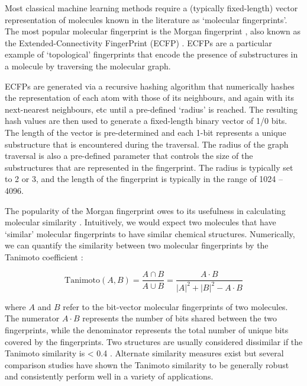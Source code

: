 
Most classical machine learning methods require a (typically fixed-length) vector representation of molecules known in the literature as `molecular fingerprints'. The most popular molecular fingerprint is the Morgan fingerprint \cite{morgan1965fingerprints}, also known as the Extended-Connectivity FingerPrint (ECFP) \cite{rogers2010extended}. ECFPs are a particular example of `topological' fingerprints that encode the presence of substructures in a molecule by traversing the molecular graph.

ECFPs are generated via a recursive hashing algorithm that numerically hashes the representation of each atom with those of its neighbours, and again with its next-nearest neighbours, etc until a pre-defined `radius' is reached. The resulting hash values are then used to generate a fixed-length binary vector of 1/0 bits. The length of the vector is pre-determined and each 1-bit represents a unique substructure that is encountered during the traversal. The radius of the graph traversal is also a pre-defined parameter that controls the size of the substructures that are represented in the fingerprint. The radius is typically set to 2 or 3, and the length of the fingerprint is typically in the range of 1024 -- 4096.

The popularity of the Morgan fingerprint owes to its usefulness in calculating molecular similarity \cite{Maggiora2014similarity}. Intuitively, we would expect two molecules that have `similar' molecular fingerprints to have similar chemical structures. Numerically, we can quantify the similarity between two molecular fingerprints by the Tanimoto coefficient \cite{Willet1998similarity}:

\begin{equation} \label{eqn:tanimoto}
 \mathrm{Tanimoto}(A, B) = \frac{A \cap B}{A \cup B} = \frac{A \cdot B}{|A|^{2} + |B|^{2} - A \cdot B}
\end{equation}

where $A$ and $B$ refer to the bit-vector molecular fingerprints of two molecules. The numerator $A \cdot B$ represents the number of bits shared between the two fingerprints, while the denominator represents the total number of unique bits covered by the fingerprints. Two structures are usually considered dissimilar if the Tanimoto similarity is < 0.4 \cite{baldi2010similarity}. Alternate similarity measures exist but several comparison studies \cite{Todeschini2012tanimoto, Bajusz2015Tanimoto} have shown the Tanimoto similarity to be generally robust and consistently perform well in a variety of applications.

